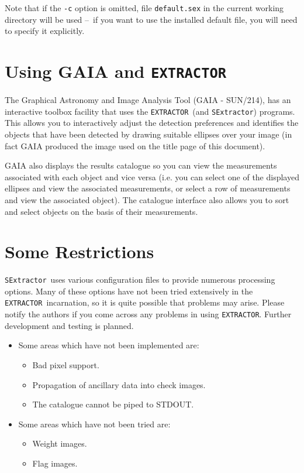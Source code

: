 \documentclass[twoside,11pt]{article}
\newcommand{\xref}[3]{#1}
\newcommand{\xlabel}[1]{}
\renewcommand{\_}{\texttt{\symbol{95}}}
\newcommand{\EXTRACTOR}{\texttt{EXTRACTOR}}
\newcommand{\SExtractor}{\texttt{SExtractor}}
\newcommand{\dash}{--}
\newcommand{\dash}{-}
\begin{document}
Note that if the \texttt{-c} option is omitted, file \texttt{default.sex} in the
current working directory will be used \dash\ if you want to use the installed
default file, you will need to specify it explicitly.

\section{\xlabel{using_gaia_and_extractor}Using GAIA and \EXTRACTOR}
The Graphical Astronomy and Image Analysis Tool (GAIA -
\xref{SUN/214}{sun214}{}), has an interactive toolbox facility that
uses the \EXTRACTOR\ (and \SExtractor) programs. This allows you to
interactively adjust the detection preferences and identifies the
objects that have been detected by drawing suitable ellipses over your
image (in fact GAIA produced the image used on the title page of this
document).

GAIA also displays the results catalogue so you can view the
measurements associated with each object and vice versa (i.e. you can
select one of the displayed ellipses and view the associated
measurements, or select a row of measurements and view the associated
object). The catalogue interface also allows you to sort and select
objects on the basis of their measurements.

\section{\label{some_restrictions}\xlabel{some_restrictions}Some Restrictions}

\SExtractor\ uses various configuration files to provide numerous
processing options.  Many of these options have not been tried
extensively in the \EXTRACTOR\ incarnation, so it is quite possible
that problems may arise. Please notify the authors if you come across
any problems in using \EXTRACTOR. Further development and testing is
planned.

\begin{itemize}
\item Some areas which have not been implemented are:
\begin{itemize}
 \item Bad pixel support.
 \item Propagation of ancillary data into check images.
 \item The catalogue cannot be piped to STDOUT.
\end{itemize}
\item Some areas which have not been tried are:
\begin{itemize}
 \item Weight images.
 \item Flag images.
\end{itemize}
\end{itemize}
\end{document}
